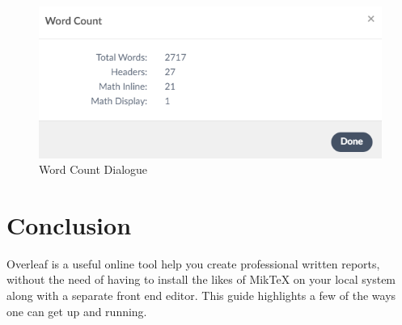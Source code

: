 \documentclass[12pt]{article}
\begin{document}
\begin{figure}[H]
\begin{center}
\includegraphics[width=.55\linewidth]{09-GetWordCountOutput.png}
\caption{Word Count Dialogue} \label{fig:09:WordCount}
\end{center}
\end{figure}

\section{Conclusion}
Overleaf is a useful online tool help you create professional written reports, without the need of having to install the likes of MikTeX on your local system along with a separate front end editor. This guide highlights a few of the ways one can get up and running. 
\end{document}

